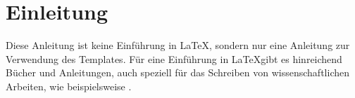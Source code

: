 %
\chapter{Einleitung}
Diese Anleitung ist keine Einführung in \LaTeX, sondern nur eine Anleitung zur Verwendung des Templates. Für eine Einführung in \LaTeX gibt es hinreichend Bücher und Anleitungen, auch speziell für das Schreiben von wissenschaftlichen Arbeiten, wie beispielsweise \citep{schlosser2016wissenschaftliche}.
